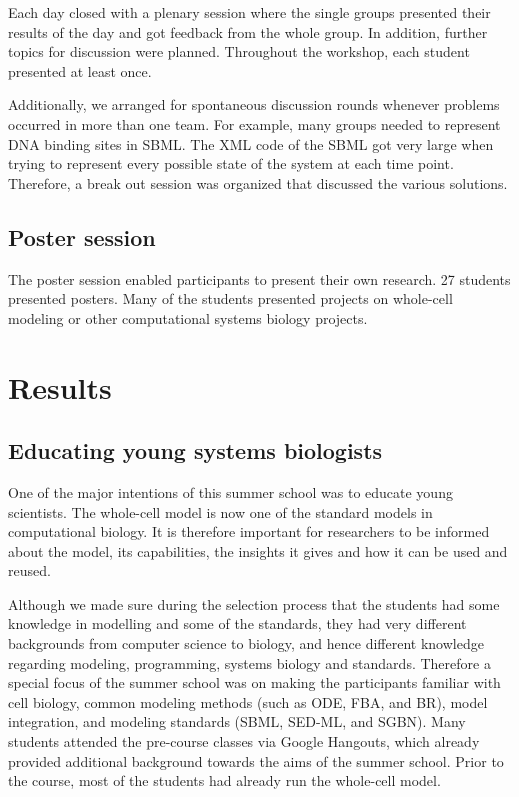 \documentclass[journal,transmag]{IEEEtran}
\begin{document}
Each day closed with a plenary session where the single groups presented their results of the day and got feedback from the whole group. In addition, further topics for discussion were planned.
Throughout the workshop, each student presented at least once. 

Additionally, we arranged for spontaneous discussion rounds whenever problems occurred in more than one team. 
For example, many groups needed to represent DNA binding sites in SBML. 
The XML code of the SBML got very large when trying to represent every possible state of the system at each time point. 
Therefore, a break out session was organized that discussed the various solutions. 

\subsection{Poster session}
The poster session enabled participants to present their own research. 
27 students presented posters. Many of the students presented projects on whole-cell modeling or other computational systems biology projects.

\section{Results}

\subsection{Educating young systems biologists}
One of the major intentions of this summer school was to educate young scientists. 
The whole-cell model is now one of the standard models in computational biology. 
It is therefore important for researchers to be informed about the model, its capabilities, the insights it gives and how it can be used and reused. 

Although we made sure during the selection process that the students had some knowledge in modelling and some of the standards, they had very different backgrounds from computer science to biology, and hence different knowledge regarding modeling, programming, systems biology and standards. Therefore a special focus of the summer school was on making the participants familiar with cell biology, common modeling methods (such as ODE, FBA, and BR), model integration, and modeling standards (SBML, SED-ML, and SGBN). Many students attended the pre-course classes via Google Hangouts, which already provided additional background towards the aims of the summer school. 
Prior to the course, most of the students had already run the whole-cell model. 
\end{document}
